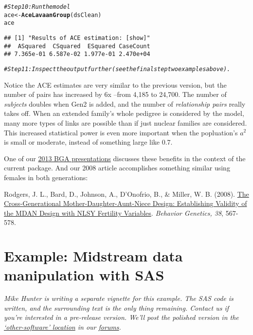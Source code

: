 \documentclass{article}\usepackage[]{graphicx}\usepackage[]{color}
\makeatletter
\newcommand{\hlcom}[1]{\textcolor[rgb]{0.678,0.584,0.686}{\textit{#1}}}%
\newcommand{\hlstd}[1]{\textcolor[rgb]{0.345,0.345,0.345}{#1}}%
\newcommand{\hlkwb}[1]{\textcolor[rgb]{0.69,0.353,0.396}{#1}}%
\newcommand{\hlkwd}[1]{\textcolor[rgb]{0.737,0.353,0.396}{\textbf{#1}}}%
\newenvironment{kframe}{%
 \def\at@end@of@kframe{}%
 \ifinner\ifhmode%
  \def\at@end@of@kframe{\end{minipage}}%
  \begin{minipage}{\columnwidth}%
 \fi\fi%
 \def\FrameCommand##1{\hskip\@totalleftmargin \hskip-\fboxsep
 \colorbox{shadecolor}{##1}\hskip-\fboxsep
     \hskip-\linewidth \hskip-\@totalleftmargin \hskip\columnwidth}%
 \MakeFramed {\advance\hsize-\width
   \@totalleftmargin\z@ \linewidth\hsize
   \@setminipage}}%
 {\par\unskip\endMakeFramed%
 \at@end@of@kframe}
\newenvironment{knitrout}{}{} %
\makeatother
\begin{document}
\begin{knitrout}
\begin{kframe}
\begin{alltt}
\hlcom{#Step 10: Run the model}
\hlstd{ace} \hlkwb{<-} \hlkwd{AceLavaanGroup}\hlstd{(dsClean)}
\hlstd{ace}
\end{alltt}
\begin{verbatim}
## [1] "Results of ACE estimation: [show]"
##  ASquared  CSquared  ESquared CaseCount 
## 7.365e-01 6.587e-02 1.977e-01 2.470e+04
\end{verbatim}
\begin{alltt}
\hlcom{#Step 11: Inspect the output further (see the final step two examples above).}
\end{alltt}
\end{kframe}
\end{knitrout}


Notice the ACE estimates are very similar to the previous version, but the number of pairs has increased by 6x --from 4,185 to 24,700.  The number of \emph{subjects} doubles when Gen2 is added, and the number of \emph{relationship pairs} really takes off.  When an extended family's whole pedigree is considered by the model, many more types of links are possible than if just nuclear families are considered.  This increased statistical power is even more important when the popluation's $a^2$ is small or moderate, instead of something large like 0.7.

One of our \href{https://r-forge.r-project.org/forum/forum.php?thread_id=28498&forum_id=4266&group_id=1330}{2013 BGA presentations}  discusses these benefits in the context of the current  package.  And our 2008 article accomplishes something similar using females in both generations:

Rodgers, J. L., Bard, D., Johnson, A., D'Onofrio, B., \& Miller, W. B. (2008). \href{http://www.ncbi.nlm.nih.gov/pubmed/18825497}{The Cross-Generational Mother-Daughter-Aunt-Niece Design: Establishing Validity of the MDAN Design with NLSY Fertility Variables}. \emph{Behavior Genetics, 38}, 567-578.

\section{Example: Midstream data manipulation with SAS}
\emph{Mike Hunter is writing a separate vignette for this example.  The SAS code is written, and the surrounding text is the only thing remaining.  Contact us if you're interested in a pre-release version.  We'll post the polished version in the \href{https://r-forge.r-project.org/forum/forum.php?forum_id=4316&group_id=1330}{`other-software' location} in our \href{https://r-forge.r-project.org/forum/?group_id=1330}{forums}. }
\end{document}
